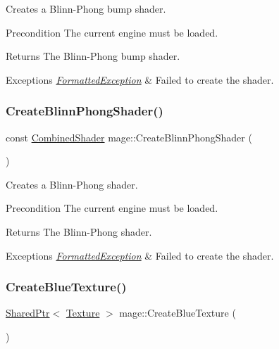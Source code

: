 Creates a Blinn-\/\+Phong bump shader.

\begin{DoxyPrecond}{Precondition}
The current engine must be loaded. 
\end{DoxyPrecond}
\begin{DoxyReturn}{Returns}
The Blinn-\/\+Phong bump shader. 
\end{DoxyReturn}

\begin{DoxyExceptions}{Exceptions}
{\em \hyperlink{structmage_1_1_formatted_exception}{Formatted\+Exception}} & Failed to create the shader. \\
\hline
\end{DoxyExceptions}
\hypertarget{namespacemage_a783f8a6abdb9fa4c530734ae660b6b03}{}\label{namespacemage_a783f8a6abdb9fa4c530734ae660b6b03} 
\subsubsection{\texorpdfstring{Create\+Blinn\+Phong\+Shader()}{CreateBlinnPhongShader()}}
{\footnotesize\ttfamily const \hyperlink{structmage_1_1_combined_shader}{Combined\+Shader} mage\+::\+Create\+Blinn\+Phong\+Shader (\begin{DoxyParamCaption}{ }\end{DoxyParamCaption})}

Creates a Blinn-\/\+Phong shader.

\begin{DoxyPrecond}{Precondition}
The current engine must be loaded. 
\end{DoxyPrecond}
\begin{DoxyReturn}{Returns}
The Blinn-\/\+Phong shader. 
\end{DoxyReturn}

\begin{DoxyExceptions}{Exceptions}
{\em \hyperlink{structmage_1_1_formatted_exception}{Formatted\+Exception}} & Failed to create the shader. \\
\hline
\end{DoxyExceptions}
\hypertarget{namespacemage_ae09e6160c64eba1b750bf947338dadf1}{}\label{namespacemage_ae09e6160c64eba1b750bf947338dadf1} 
\subsubsection{\texorpdfstring{Create\+Blue\+Texture()}{CreateBlueTexture()}}
{\footnotesize\ttfamily \hyperlink{namespacemage_a1e01ae66713838a7a67d30e44c67703e}{Shared\+Ptr}$<$ \hyperlink{classmage_1_1_texture}{Texture} $>$ mage\+::\+Create\+Blue\+Texture (\begin{DoxyParamCaption}{ }\end{DoxyParamCaption})}


